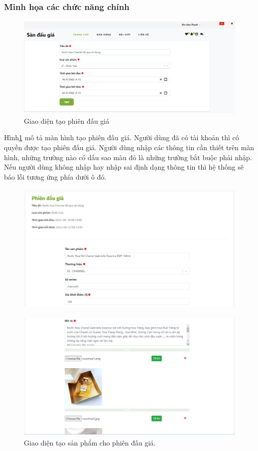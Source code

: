 \documentclass{article}
\begin{document}
\subsubsection{Minh họa các chức năng chính}
\begin{figure}[H]
    \centering
    \includegraphics[width=11.4cm,height=4.95cm]{images/createauctiondemo.png}
    \caption{Giao diện tạo phiên đấu giá}
    \label{hinh414}
\end{figure}
Hình\ref{hinh414} mô tả màn hình tạo phiên đấu giá. Người dùng đã có tài khoản thì có quyền được tạo phiên đấu giá. Người dùng nhập các thông tin cần thiết trên màn hình, những trường nào có dấu sao màu đỏ là những trường bắt buộc phải nhập. Nếu người dùng không nhập hay nhập sai định dạng thông tin thì hệ thống sẽ báo lỗi tương ứng phía dưới ô đó. 
\begin{figure}[H]
    \centering
    \includegraphics[width=11.4cm,height=6.28cm]{images/createitem1demo.png}
    \label{hinh4151}
\end{figure}
\begin{figure}[H]
    \centering
    \includegraphics[width=11.4cm,height=6.32cm]{images/createitem2demo.png}
    \caption{Giao diện tạo sản phẩm cho phiên đấu giá.}
    \label{hinh415}
\end{figure}
\end{document}
